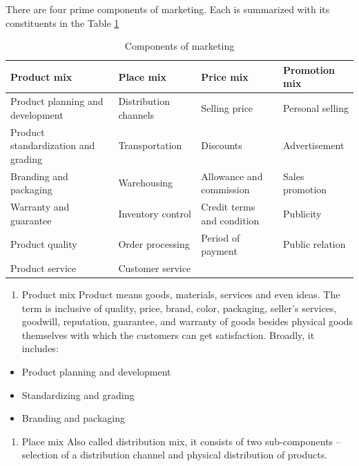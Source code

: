 \documentclass[11pt,]{book}
\providecommand{\tightlist}{%
  \setlength{\itemsep}{0pt}\setlength{\parskip}{0pt}}
\theoremstyle{definition}
\theoremstyle{definition}
\theoremstyle{definition}
\theoremstyle{remark}
\begin{document}
There are four prime components of marketing. Each is summarized with
its constituents in the Table \ref{tab:component-marketing}

\begin{table}[H]

\caption{\label{tab:component-marketing}Components of marketing}
\centering
\begin{tabular}[t]{>{\raggedright\arraybackslash}p{3.95cm}>{\raggedright\arraybackslash}p{3.95cm}>{\raggedright\arraybackslash}p{3.95cm}>{\raggedright\arraybackslash}p{3.95cm}}
\toprule
\textbf{Product mix} & \textbf{Place mix} & \textbf{Price mix} & \textbf{Promotion mix}\\
\midrule
Product planning and development & Distribution channels & Selling price & Personal selling\\
Product standardization and grading & Transportation & Discounts & Advertisement\\
Branding and packaging & Warehousing & Allowance and commission & Sales promotion\\
Warranty and guarantee & Inventory control & Credit terms and condition & Publicity\\
Product quality & Order processing & Period of payment & Public relation\\
Product service & Customer service &  & \\
\bottomrule
\end{tabular}
\end{table}

\begin{enumerate}
\def\labelenumi{\arabic{enumi}.}
\tightlist
\item
  Product mix \newline Product means goods, materials, services and even
  ideas. The term is inclusive of quality, price, brand, color,
  packaging, seller's services, goodwill, reputation, guarantee, and
  warranty of goods besides physical goods themselves with which the
  customers can get satisfaction. Broadly, it includes:
\end{enumerate}

\begin{itemize}
\tightlist
\item
  Product planning and development
\item
  Standardizing and grading
\item
  Branding and packaging
\end{itemize}

\begin{enumerate}
\def\labelenumi{\arabic{enumi}.}
\setcounter{enumi}{1}
\tightlist
\item
  Place mix \newline Also called distribution mix, it consists of two
  sub-components -- selection of a distribution channel and physical
  distribution of products.
\end{enumerate}
\end{document}
